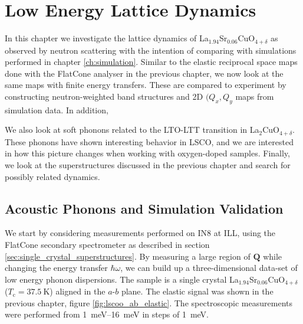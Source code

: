 \chapter{Low Energy Lattice Dynamics}\label{ch:lowen}
In this chapter we investigate the lattice dynamics of La$_{1.94}$Sr$_{0.06}$CuO$_{4+\delta}$ as observed by neutron scattering with the intention of comparing with simulations performed in chapter \ref{ch:simulation}. Similar to the elastic reciprocal space maps done with the FlatCone analyser in the previous chapter, we now look at the same maps with finite energy transfers. These are compared to experiment by constructing neutron-weighted band structures and 2D $(Q_x,Q_y$ maps from simulation data. In addition, 

We also look at soft phonons related to the LTO-LTT transition in La$_2$CuO$_{4+\delta}$. These phonons have shown interesting behavior in LSCO, and we are interested in how this picture changes when working with oxygen-doped samples. Finally, we look at the superstructures discussed in the previous chapter and search for possibly related dynamics.

\section{Acoustic Phonons and Simulation Validation}
We start by considering measurements performed on IN8 at ILL, using the FlatCone secondary spectrometer as described in section \ref{sec:single_crystal_superstructures}. By measuring a large region of $\bm{Q}$ while changing the energy transfer $\hbar\omega$, we can build up a three-dimensional data-set of low energy phonon dispersions. The sample is a single crystal La$_{1.94}$Sr$_{0.06}$CuO$_{4+\delta}$ ($T_\text{c} = \SI{37.5}{\kelvin}$) aligned in the $a$-$b$ plane. The elastic signal was shown in the previous chapter, figure \ref{fig:lscoo_ab_elastic}. The spectroscopic measurements were performed from \SIrange{1}{16}{\milli\eV} in steps of \SI{1}{\milli\eV}.

